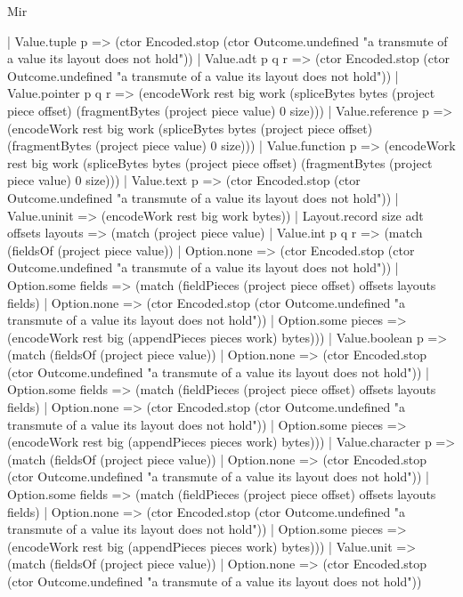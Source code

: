 \begin{lexlean}{Mir}
\begin{semanticmodule}
{          | Value.tuple p => (ctor Encoded.stop (ctor Outcome.undefined "a transmute of a value its layout does not hold"))
          | Value.adt p q r => (ctor Encoded.stop (ctor Outcome.undefined "a transmute of a value its layout does not hold"))
          | Value.pointer p q r => (encodeWork rest big work (spliceBytes bytes (project piece offset) (fragmentBytes (project piece value) 0 size)))
          | Value.reference p => (encodeWork rest big work (spliceBytes bytes (project piece offset) (fragmentBytes (project piece value) 0 size)))
          | Value.function p => (encodeWork rest big work (spliceBytes bytes (project piece offset) (fragmentBytes (project piece value) 0 size)))
          | Value.text p => (ctor Encoded.stop (ctor Outcome.undefined "a transmute of a value its layout does not hold"))
          | Value.uninit => (encodeWork rest big work bytes))
        | Layout.record size adt offsets layouts => (match (project piece value)
          | Value.int p q r => (match (fieldsOf (project piece value))
            | Option.none => (ctor Encoded.stop (ctor Outcome.undefined "a transmute of a value its layout does not hold"))
            | Option.some fields => (match (fieldPieces (project piece offset) offsets layouts fields)
              | Option.none => (ctor Encoded.stop (ctor Outcome.undefined "a transmute of a value its layout does not hold"))
              | Option.some pieces => (encodeWork rest big (appendPieces pieces work) bytes)))
          | Value.boolean p => (match (fieldsOf (project piece value))
            | Option.none => (ctor Encoded.stop (ctor Outcome.undefined "a transmute of a value its layout does not hold"))
            | Option.some fields => (match (fieldPieces (project piece offset) offsets layouts fields)
              | Option.none => (ctor Encoded.stop (ctor Outcome.undefined "a transmute of a value its layout does not hold"))
              | Option.some pieces => (encodeWork rest big (appendPieces pieces work) bytes)))
          | Value.character p => (match (fieldsOf (project piece value))
            | Option.none => (ctor Encoded.stop (ctor Outcome.undefined "a transmute of a value its layout does not hold"))
            | Option.some fields => (match (fieldPieces (project piece offset) offsets layouts fields)
              | Option.none => (ctor Encoded.stop (ctor Outcome.undefined "a transmute of a value its layout does not hold"))
              | Option.some pieces => (encodeWork rest big (appendPieces pieces work) bytes)))
          | Value.unit => (match (fieldsOf (project piece value))
            | Option.none => (ctor Encoded.stop (ctor Outcome.undefined "a transmute of a value its layout does not hold"))
}
\end{semanticmodule}
\end{lexlean}
